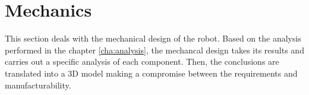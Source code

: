 \section{Mechanics} %
\label{sec:mechanics}
This section deals with the mechanical design of the robot.
Based on the analysis performed in the chapter \ref{cha:analysis}, the mechancal design takes its results and carries out a specific analysis of each component.
Then, the conclusions are translated into a 3D model making a compromise between the requirements and manufacturability.











